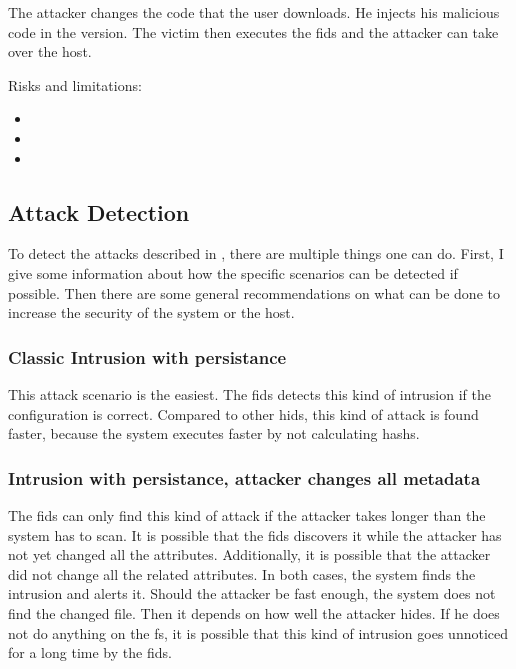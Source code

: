 The attacker changes the code that the user downloads. He injects his malicious code in the version. The victim then executes the \gls{fids} and the attacker can take over the host.

Risks and limitations:
\begin{itemize}
	\item {}
	\item {}
	\item {}
\end{itemize}

\subsection{Attack Detection}
\label{sec:mittigations}

To detect the attacks described in , there are multiple things one can do. First, I give some information about how the specific scenarios can be detected if possible. Then there are some general recommendations on what can be done to increase the security of the system or the host.

\subsubsection{Classic Intrusion with persistance}
\label{sec:defense:classic}

This attack scenario is the easiest. The \gls{fids} detects this kind of \gls{intrusion} if the configuration is correct. Compared to other \gls{hids}, this kind of attack is found faster, because the system executes faster by not calculating \glspl{hash}. 

\subsubsection{Intrusion with persistance, attacker changes all metadata}
\label{sec:defense:changeattr}

The \gls{fids} can only find this kind of attack if the attacker takes longer than the system has to scan. It is possible that the \gls{fids} discovers it while the attacker has not yet changed all the attributes. Additionally, it is possible that the attacker did not change all the related attributes. In both cases, the system finds the \gls{intrusion} and alerts it. Should the attacker be fast enough, the system does not find the changed file. Then it depends on how well the attacker hides. If he does not do anything on the \gls{fs}, it is possible that this kind of \gls{intrusion} goes unnoticed for a long time by the \gls{fids}. 

